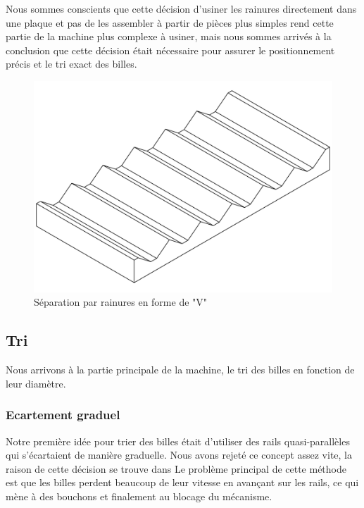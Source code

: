 Nous sommes conscients que cette décision d'usiner les rainures directement dans une plaque et pas de les assembler à partir de pièces plus simples rend cette partie de la machine plus complexe à usiner, mais nous sommes arrivés à la conclusion que cette décision était nécessaire pour assurer le positionnement précis et le tri exact des billes.


\begin{figure}
    \centering
    \includegraphics[width=\textwidth]{Graphics/Rails/SEPARATEUR_V.pdf}
    \caption{Séparation par rainures en forme de "V"}
\end{figure}

\subsection{Tri}
Nous arrivons à la partie principale de la machine, le tri des billes en fonction de leur diamètre.

\subsubsection{Ecartement graduel}
Notre première idée pour trier des billes était d'utiliser des rails quasi-parallèles qui s'écartaient de manière graduelle. Nous avons rejeté ce concept assez vite, la raison de cette décision se trouve dans %
Le problème principal de cette méthode est que les billes perdent beaucoup de leur vitesse en avançant sur les rails, ce qui mène à des bouchons et finalement au blocage du mécanisme.

